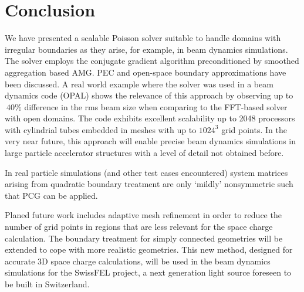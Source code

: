 \section{Conclusion}
\label{sec:concl}

We have presented a scalable Poisson solver suitable to handle domains
with irregular boundaries as they arise, for example, in beam dynamics
simulations.  The solver employs the conjugate gradient algorithm
preconditioned by smoothed aggregation based AMG.  PEC and
open-space boundary approximations have been discussed.  A real world
example where the solver was used in a beam dynamics code (OPAL) shows
the relevance of this approach by observing up to $~40\%$ difference in
the rms beam size when comparing to the FFT-based solver with open
domains.  The code exhibits excellent scalability up to 2048 processors
with cylindrial tubes embedded in meshes with up to $1024^3$ grid
points.  In the very near future, this approach will enable precise beam
dynamics simulations in large particle accelerator structures with a
level of detail not obtained before.

In real particle simulations (and other test cases encountered) system
matrices arising from quadratic boundary treatment are only `mildly'
nonsymmetric such that PCG can be applied.

Planed future work includes adaptive mesh refinement in order to reduce
the number of grid points in regions that are less relevant for the
space charge calculation.  The boundary treatment for simply connected
geometries will be extended to cope with more realistic geometries.  This
new method, designed for accurate 3D space charge calculations, will be
used in the beam dynamics simulations for the SwissFEL project, a next
generation light source foreseen to be built in Switzerland.

